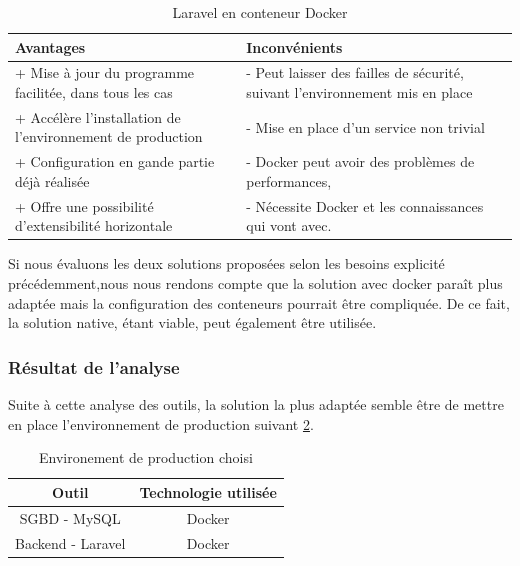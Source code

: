 \documentclass[
    iai, %
    il, %
]{heig-tb}
\begin{document}
\begin{table}[h]
    \begin{center}
        \caption{Laravel en conteneur Docker \label{prod-laravel-docker}}
        \begin{tabularx}{1.0\textwidth} {X|X}
            Avantages                                                  & Inconvénients                        \\ \hline
            + Mise à jour du programme facilitée, dans tous les cas    & - Peut laisser des failles de
            sécurité, suivant l'environnement mis en place                                                    \\
            + Accélère l'installation de l'environnement de production & - Mise en place d'un service
            non trivial                                                                                       \\
            + Configuration en gande partie déjà réalisée              & - Docker peut avoir des problèmes de
            performances, \cite{labrecque}                                                                    \\
            + Offre une possibilité d'extensibilité horizontale        & - Nécessite Docker et les
            connaissances qui vont avec. \cite{labrecque}                                                     \\
        \end{tabularx}
    \end{center}
\end{table}

Si nous évaluons les deux solutions proposées selon les besoins explicité précédemment,nous nous rendons compte que la solution avec \Gls{docker} paraît plus adaptée mais la configuration des \Gls{conteneur}s pourrait être compliquée. De ce fait, la solution native, étant viable, peut également être utilisée.

\subsubsection{Résultat de l'analyse}
Suite à cette analyse des outils, la solution la plus adaptée semble être de mettre en place
l'environnement de production suivant \ref{env-prod}.

\begin{table}[h]
    \begin{center}
        \caption{Environement de production choisi \label{env-prod}}
        \begin{tabular}{c|c}
            Outil             & Technologie utilisée \\ \hline
            SGBD - MySQL      & Docker               \\
            Backend - Laravel & Docker               \\
        \end{tabular}
    \end{center}
\end{table}
\end{document}
